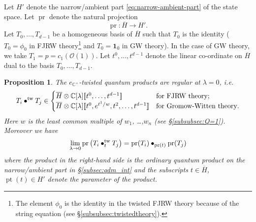 \documentclass[11pt]{amsart}
\newtheorem{pro}[thm]{Proposition} %
\theoremstyle{definition} %
\theoremstyle{remark} %
\newcommand{\CC}{\mathbb C}
\newcommand{\pt}{\operatorname{pt}}
\newcommand{\tw}{{\rm tw}}
\newcommand{\cO}{\mathcal{O}}
\newcommand{\unit}{\boldsymbol{1}}
\newcommand{\pr}{\operatorname{pr}}
\newcommand{\ov}{\overline}
\begin{document}
Let $H'$ denote the narrow/ambient part 
\eqref{eq:narrow-ambient-part} of the state space. 
Let $\pr$ denote the natural projection 
\[
\pr \colon \ov{H} \longrightarrow  H'. 
\]
Let $T_0,\dots,T_{d-1}$ be a homogeneous basis of $\ov{H}$ 
such that $T_0$ is the identity ($T_0 =\phi_0$ in FJRW theory\footnote
{The element $\phi_0$ is the identity in the twisted FJRW theory 
because of the string equation  
(see \S \ref{subsubsec:twistedtheory}).} 
and $T_0 = \unit_0$ in GW theory). 
In the case of GW theory, 
we take $T_1 = p = c_1(\cO(1))$. 
Let $t^0,\dots,t^{d-1}$ denote the linear co-ordinate on $\ov{H}$ 
dual to the basis $T_0,\dots, T_{d-1}$. 
\begin{pro} 
\label{pro:noneq-reduction} 
The $e_{\CC^\times}$-twisted quantum products 
are regular at $\lambda =0$, i.e. 
\[
T_i \bullet^{\tw} T_j \in 
\begin{cases} 
\ov{H} \otimes \CC[\lambda][\![t^0,\dots,t^{d-1}]\!] 
& \text{for FJRW theory;} \\ 
\ov{H} \otimes \CC[\lambda][\![t^0, e^{t^1/w}, t^2,\dots,t^{d-1}]\!]
& \text{for Gromow-Witten theory}.
\end{cases} 
\]
Here $w$ is the least common multiple of $w_1$, \dots,$w_n$ 
(see \S \ref{subsubsec:Q=1}). 
Moreover we have 
\begin{equation} 
\label{eq:pr-hom} 
\lim_{\lambda \to 0}
\pr\left( T_i \bullet^{\tw}_t T_j \right) 
= \pr(T_i) \bullet_{\pr(t)} \pr(T_j) 
\end{equation} 
where the product in the right-hand side is the 
ordinary quantum product on the narrow/ambient part 
in \S \ref{subsec:qdm_int} and the subscripts 
$t\in \ov{H}$, $\pt(t) \in H'$ denote the parameter of the product. 
\end{pro} 
\end{document}
